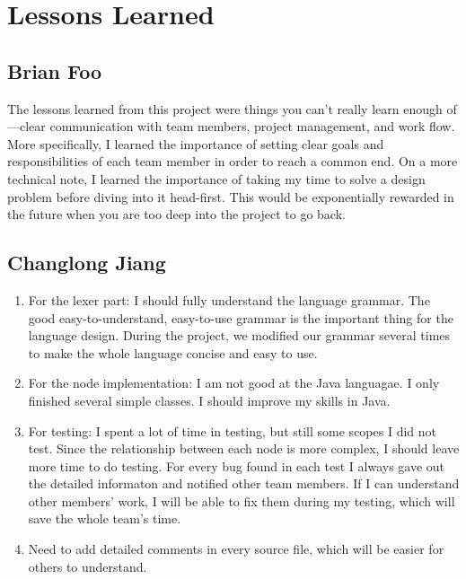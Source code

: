 \chapter{Lessons Learned}

\section{Brian Foo}

The lessons learned from this project were things you can't really
learn enough of---clear communication with team members, project
management, and work flow.  More specifically, I learned the
importance of setting clear goals and responsibilities of each team
member in order to reach a common end.  On a more technical note, I
learned the importance of taking my time to solve a design problem
before diving into it head-first.  This would be exponentially
rewarded in the future when you are too deep into the project to go
back.


\section{Changlong Jiang}

\begin{enumerate}

\item For the lexer part: I should fully understand the language
  grammar. The good easy-to-understand, easy-to-use grammar is the
  important thing for the language design. During the project, we
  modified our grammar several times to make the whole language
  concise and easy to use.

\item For the node implementation: I am not good at the Java
  languagae. I only finished several simple classes. I should improve
  my skills in Java.

\item For testing: I spent a lot of time in testing, but still some
  scopes I did not test. Since the relationship between each node is
  more complex, I should leave more time to do testing. For every bug
  found in each test I always gave out the detailed informaton and
  notified other team members.  If I can understand other members'
  work, I will be able to fix them during my testing, which will save
  the whole team's time.

\item Need to add detailed comments in every source file, which will
  be easier for others to understand.

\end{enumerate}


